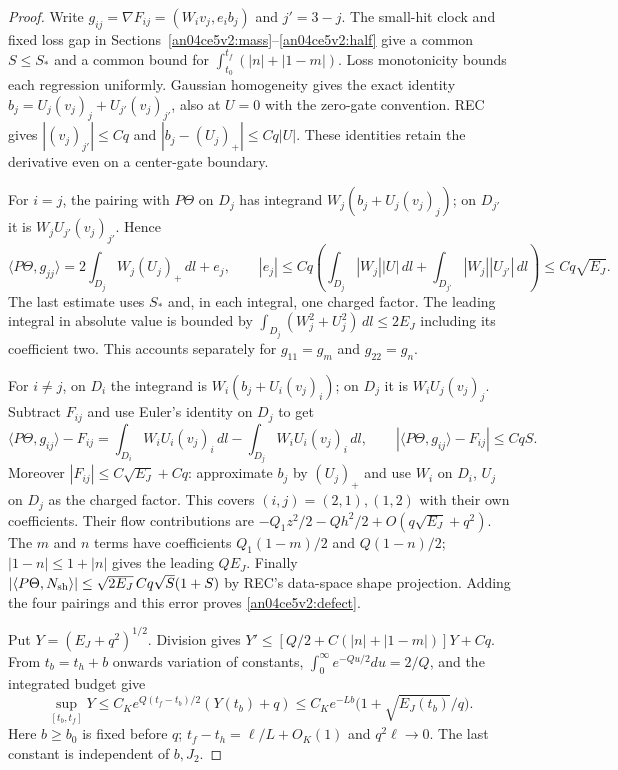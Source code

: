 \documentclass[11pt]{article}
\newcommand{\dd}{\,dl}
\begin{document}
\begin{proof}
Write $g_{ij}=\nabla F_{ij}=(W_i v_j,e_i b_j)$ and $j'=3-j$. The small-hit clock and fixed loss gap in Sections~\ref{an04ce5v2:mass}--\ref{an04ce5v2:half} give a common $S\le S_*$ and a common bound for $\int_{t_0}^{t_f}(|n|+|1-m|)$. Loss monotonicity bounds each regression uniformly. Gaussian homogeneity gives the exact identity $b_j=U_j(v_j)_j+U_{j'}(v_j)_{j'}$, also at $U=0$ with the zero-gate convention. REC gives $|(v_j)_{j'}|\le Cq$ and $|b_j-(U_j)_+|\le Cq|U|$. These identities retain the derivative even on a center-gate boundary.

For $i=j$, the pairing with $P\Theta$ on $D_j$ has integrand
$W_j(b_j+U_j(v_j)_j)$; on $D_{j'}$ it is $W_j U_{j'}(v_j)_{j'}$. Hence
\[
 \langle P\Theta,g_{jj}\rangle
 =2\int_{D_j}W_j(U_j)_+\dd+e_j,\qquad
 |e_j|\le Cq\left(\int_{D_j}|W_j||U|\dd+
              \int_{D_{j'}}|W_j||U_{j'}|\dd\right)\le Cq\sqrt{E_J}.
\]
The last estimate uses $S_*$ and, in each integral, one charged factor. The leading integral in absolute value is bounded by $\int_{D_j}(W_j^2+U_j^2)\dd\le2E_J$ including its coefficient two. This accounts separately for $g_{11}=g_m$ and $g_{22}=g_n$.

For $i\ne j$, on $D_i$ the integrand is $W_i(b_j+U_i(v_j)_i)$; on $D_j$ it is $W_iU_j(v_j)_j$. Subtract $F_{ij}$ and use Euler's identity on $D_j$ to get
\[
 \langle P\Theta,g_{ij}\rangle-F_{ij}
 =\int_{D_i}W_iU_i(v_j)_i\dd-\int_{D_j}W_iU_i(v_j)_i\dd,\qquad
 |\langle P\Theta,g_{ij}\rangle-F_{ij}|\le CqS.
\]
Moreover $|F_{ij}|\le C\sqrt{E_J}+Cq$: approximate $b_j$ by $(U_j)_+$ and use $W_i$ on $D_i$, $U_j$ on $D_j$ as the charged factor. This covers $(i,j)=(2,1),(1,2)$ with their own coefficients. Their flow contributions are $-Q_1z^2/2-Qh^2/2+O(q\sqrt{E_J}+q^2)$. The $m$ and $n$ terms have coefficients $Q_1(1-m)/2$ and $Q(1-n)/2$; $|1-n|\le1+|n|$ gives the leading $QE_J$. Finally $|\langle P\Theta,N_{\rm sh}\rangle|\le\sqrt{2E_J}\,Cq\sqrt S(1+S)$ by REC's data-space shape projection. Adding the four pairings and this error proves \eqref{an04ce5v2:defect}.

Put $Y=(E_J+q^2)^{1/2}$. Division gives $Y'\le[Q/2+C(|n|+|1-m|)]Y+Cq$. From $t_b=t_h+b$ onwards variation of constants, $\int_0^\infty e^{-Qu/2}du=2/Q$, and the integrated budget give
\[
 \sup_{[t_b,t_f]}Y\le C_K e^{Q(t_f-t_b)/2}(Y(t_b)+q)
 \le C_K e^{-Lb}\big(1+\sqrt{E_J(t_b)}/q\big).
\]
Here $b\ge b_0$ is fixed before $q$; $t_f-t_h=\ell/L+O_K(1)$ and $q^2\ell\to0$. The last constant is independent of $b,J_2$.


\end{proof}
\end{document}

